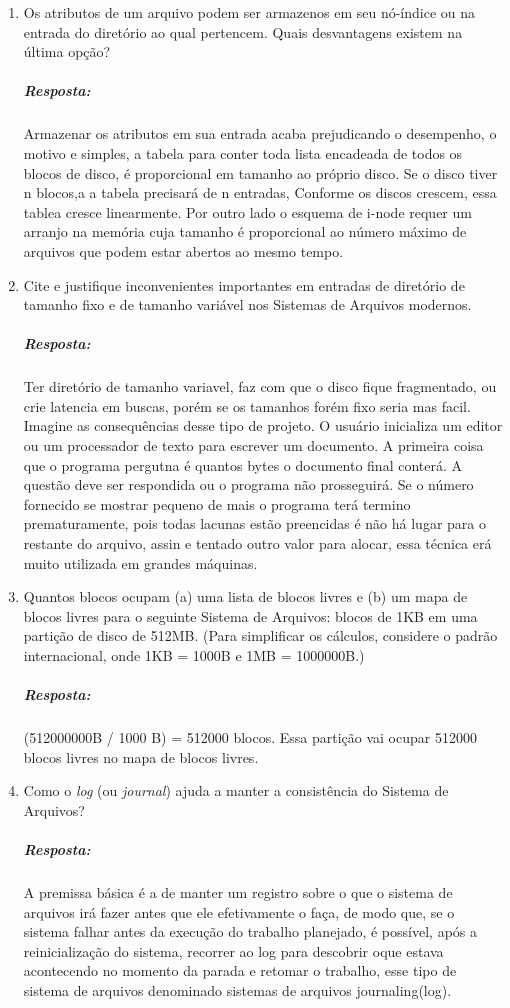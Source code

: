 \documentclass[12pt]{article}
\begin{document}
\begin{enumerate}
\item
Os atributos de um arquivo podem ser armazenos em seu nó-índice ou na
entrada do diretório ao qual pertencem. Quais desvantagens existem na
última opção?
 \subparagraph{Resposta:}
 Armazenar os atributos em sua entrada acaba prejudicando o desempenho, o motivo e simples, a tabela para conter toda lista encadeada de todos os blocos de disco, é proporcional em tamanho ao próprio disco. Se o disco tiver n blocos,a a tabela precisará de n entradas, Conforme os discos crescem, essa tablea cresce linearmente. Por outro lado o esquema de i-node requer um arranjo na memória cuja tamanho é proporcional ao número máximo de arquivos que podem estar abertos ao mesmo tempo.
\item
Cite e justifique inconvenientes importantes em entradas de diretório
de tamanho fixo e de tamanho variável nos Sistemas de Arquivos
modernos.
 \subparagraph{Resposta:}
 
 Ter diretório de tamanho variavel, faz com que o disco fique fragmentado, ou crie latencia em buscas, porém se os tamanhos forém fixo seria mas facil. Imagine as consequências desse tipo de projeto. O usuário inicializa um editor ou um processador de texto para escrever um documento. A primeira coisa que o programa pergutna é quantos bytes o documento final conterá. A questão deve ser respondida ou o programa não prosseguirá. Se o número fornecido se mostrar pequeno de mais o programa terá termino prematuramente, pois todas lacunas estão preencidas é não há lugar para o restante do arquivo, assin e tentado outro valor para alocar, essa técnica erá muito utilizada em grandes máquinas.
\item
Quantos blocos ocupam (a) uma lista de blocos livres e (b) um mapa de
blocos livres para o seguinte Sistema de Arquivos: blocos de 1KB em
uma partição de disco de 512MB. (Para simplificar os cálculos,
considere o padrão internacional, onde 1KB = 1000B e 1MB = 1000000B.)

 
 \subparagraph{Resposta:}
 (512000000B / 1000 B) = 512000 blocos. 
 Essa partição vai ocupar 512000 blocos livres no mapa de blocos livres. 
\item
Como o \emph{log} (ou \emph{journal}) ajuda a manter a consistência do
Sistema de Arquivos?
 \subparagraph{Resposta:}
	 A premissa básica é a de manter um registro sobre o que o sistema de arquivos irá fazer antes que ele efetivamente o faça, de modo que, se o sistema falhar antes da execução do trabalho planejado, é possível, após a reinicialização do sistema, recorrer ao log para descobrir oque estava acontecendo no momento da parada e retomar o trabalho, esse tipo de sistema de arquivos denominado sistemas de arquivos journaling(log).
 

\end{enumerate}
\end{document}
